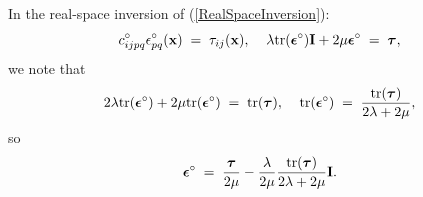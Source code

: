 \documentclass[12pt]{article}
\def\bmath#1{\mbox{\boldmath$#1$}}
\begin{document}
In the real-space inversion of (\ref{RealSpaceInversion}):
\begin{equation}
 c^\circ_{ijpq} \epsilon^\circ_{pq}({\bf x}) 
 \;=\; \tau_{ij}({\bf x}), \;\;\;\;
 \lambda{\rm tr}(\bmath{\epsilon}^\circ){\bf I} + 
 2\mu\bmath{\epsilon}^\circ \;=\; \bmath{\tau},
\end{equation}
we note that
\begin{equation}
 2\lambda{\rm tr}(\bmath{\epsilon}^\circ) + 
 2\mu {\rm tr}(\bmath{\epsilon}^\circ)
\;=\; {\rm tr}(\bmath{\tau}), \;\;\;\;
 {\rm tr}(\bmath{\epsilon}^\circ) \;=\; 
 \frac{{\rm tr}(\bmath{\tau})}{2\lambda+2\mu},
\end{equation}
so 
\begin{equation}
  \bmath{\epsilon}^\circ \;=\; \frac{\bmath{\tau}}{2\mu} - 
  \frac{\lambda}{2\mu}
 \frac{{\rm tr}(\bmath{\tau})}{2\lambda+2\mu} {\bf I}.
 \label{IsotropicStrainStress2D}
\end{equation}



\end{document}
